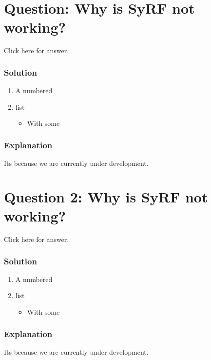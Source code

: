 \documentclass[
]{book}
\providecommand{\tightlist}{%
  \setlength{\itemsep}{0pt}\setlength{\parskip}{0pt}}
\begin{document}
\hypertarget{question-why-is-syrf-not-working}{%
\section{Question: Why is SyRF not working?}\label{question-why-is-syrf-not-working}}

Click here for answer.

\hypertarget{solution}{%
\subsubsection{Solution}\label{solution}}

\begin{enumerate}
\def\labelenumi{\arabic{enumi}.}
\tightlist
\item
  A numbered
\item
  list

  \begin{itemize}
  \tightlist
  \item
    With some
  \end{itemize}
\end{enumerate}

\hypertarget{explanation}{%
\subsubsection{Explanation}\label{explanation}}

Its because we are currently under development.

\hypertarget{question-2-why-is-syrf-not-working}{%
\section{Question 2: Why is SyRF not working?}\label{question-2-why-is-syrf-not-working}}

Click here for answer.

\hypertarget{solution-1}{%
\subsubsection{Solution}\label{solution-1}}

\begin{enumerate}
\def\labelenumi{\arabic{enumi}.}
\tightlist
\item
  A numbered
\item
  list

  \begin{itemize}
  \tightlist
  \item
    With some
  \end{itemize}
\end{enumerate}

\hypertarget{explanation-1}{%
\subsubsection{Explanation}\label{explanation-1}}

Its because we are currently under development.

  
\end{document}
